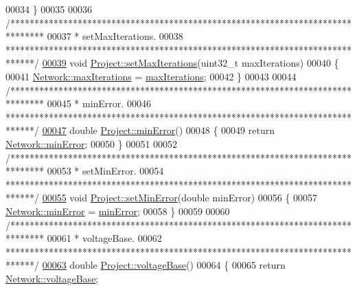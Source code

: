 \begin{DoxyCode}
00034 \}
00035 
00036 \textcolor{comment}{/*******************************************************************************}
00037 \textcolor{comment}{ * setMaxIterations.}
00038 \textcolor{comment}{ ******************************************************************************/}
\hypertarget{project_8cpp_source_l00039}{}\hyperlink{class_project_af2046a5d542d3e3dd51cb9cb04604e8f}{00039} \textcolor{keywordtype}{void} \hyperlink{class_project_af2046a5d542d3e3dd51cb9cb04604e8f}{Project::setMaxIterations}(uint32\_t maxIterations)
00040 \{
00041   \hyperlink{group___graphics_ga318dee060bc577eacd67d332efbbe1b2}{Network::maxIterations} = \hyperlink{class_project_ab9d6426396a75f2fcaeadcddcd0fac64}{maxIterations};
00042 \}
00043 
00044 \textcolor{comment}{/*******************************************************************************}
00045 \textcolor{comment}{ * minError.}
00046 \textcolor{comment}{ ******************************************************************************/}
\hypertarget{project_8cpp_source_l00047}{}\hyperlink{class_project_a457ed8d3b0ea5816f928977509f69a34}{00047} \textcolor{keywordtype}{double} \hyperlink{class_project_a457ed8d3b0ea5816f928977509f69a34}{Project::minError}()
00048 \{
00049   \textcolor{keywordflow}{return} \hyperlink{group___graphics_gabcdc973129d3dda7572b7a1c388da1b5}{Network::minError};
00050 \}
00051 
00052 \textcolor{comment}{/*******************************************************************************}
00053 \textcolor{comment}{ * setMinError.}
00054 \textcolor{comment}{ ******************************************************************************/}
\hypertarget{project_8cpp_source_l00055}{}\hyperlink{class_project_a2cb776c39adb42a1113bf7887d0d4636}{00055} \textcolor{keywordtype}{void} \hyperlink{class_project_a2cb776c39adb42a1113bf7887d0d4636}{Project::setMinError}(\textcolor{keywordtype}{double} minError)
00056 \{
00057   \hyperlink{group___graphics_gabcdc973129d3dda7572b7a1c388da1b5}{Network::minError} = \hyperlink{class_project_a457ed8d3b0ea5816f928977509f69a34}{minError};
00058 \}
00059 
00060 \textcolor{comment}{/*******************************************************************************}
00061 \textcolor{comment}{ * voltageBase.}
00062 \textcolor{comment}{ ******************************************************************************/}
\hypertarget{project_8cpp_source_l00063}{}\hyperlink{class_project_a4e857ccb6162f57f5d72f4e7199e4573}{00063} \textcolor{keywordtype}{double} \hyperlink{class_project_a4e857ccb6162f57f5d72f4e7199e4573}{Project::voltageBase}()
00064 \{
00065   \textcolor{keywordflow}{return} \hyperlink{group___graphics_ga7c1e79d9ac69df9a69f24eaf092fd5e5}{Network::voltageBase};

\end{DoxyCode}
